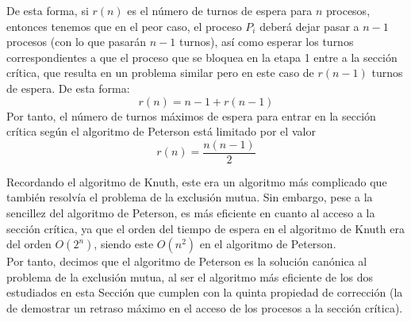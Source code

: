 \begin{description}
        De esta forma, si $r(n)$ es el número de turnos de espera para $n$ procesos, entonces tenemos que en el peor caso, el proceso $P_i$ deberá dejar pasar a $n-1$ procesos (con lo que pasarán $n-1$ turnos), así como esperar los turnos correspondientes a que el proceso que se bloquea en la etapa 1 entre a la sección crítica, que resulta en un problema similar pero en este caso de $r(n-1)$ turnos de espera. De esta forma:
        \begin{equation*}
            r(n) = n-1+r(n-1)
        \end{equation*}
        Por tanto, el número de turnos máximos de espera para entrar en la sección crítica según el algoritmo de Peterson está limitado por el valor
        \begin{equation*}
            r(n) = \dfrac{n(n-1)}{2}
        \end{equation*}
\end{description}

Recordando el algoritmo de Knuth, este era un algoritmo más complicado que también resolvía el problema de la exclusión mutua. Sin embargo, pese a la sencillez del algoritmo de Peterson, es más eficiente en cuanto al acceso a la sección crítica, ya que el orden del tiempo de espera en el algoritmo de Knuth era del orden $O(2^n)$, siendo este $O(n^2)$ en el algoritmo de Peterson.\\

Por tanto, decimos que el algoritmo de Peterson es la solución canónica al problema de la exclusión mutua, al ser el algoritmo más eficiente de los dos estudiados en esta Sección que cumplen con la quinta propiedad de corrección (la de demostrar un retraso máximo en el acceso de los procesos a la sección crítica).


